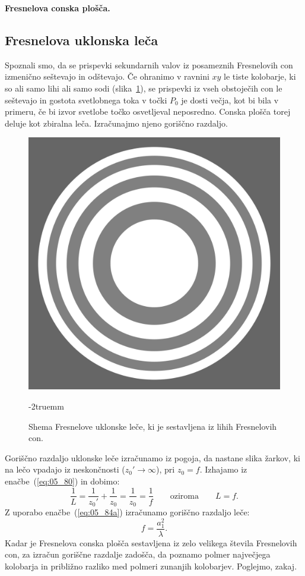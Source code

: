 \begin{example}{\bf Fresnelova conska plošča.}
\subsection*{Fresnelova uklonska leča}
Spoznali smo, da se prispevki sekundarnih valov iz posameznih Fresnelovih con izmenično
seštevajo in odštevajo. Če ohranimo v ravnini $xy$ le tiste kolobarje, ki so ali samo 
lihi ali samo sodi (slika~\ref{fig:05_lecaFr}), se prispevki iz vseh obstoječih con le seštevajo in
gostota svetlobnega toka v točki $P_0$ je dosti večja, kot bi bila 
v primeru, če bi izvor svetlobe točko osvetljeval neposredno. Conska plošča torej 
deluje kot zbiralna leča. Izračunajmo njeno goriščno razdaljo. 
\begin{figure}[ht]
\centering
\includegraphics[width=38truemm]{slike/05_FresLeca.png}
\caption{Shema Fresnelove uklonske leče, ki je sestavljena iz lihih Fresnelovih con. }
\label{fig:05_lecaFr}
\vglue-2truemm
\end{figure}

Goriščno razdaljo uklonske leče izračunamo iz pogoja, da nastane slika 
žarkov, ki na lečo vpadajo iz neskončnosti ($z_0'\to \infty$), pri $z_0 = f$. Izhajamo 
iz enačbe~(\ref{eq:05_80}) in dobimo:
\begin{equation}
\frac{1}{L} = \frac{1}{z_0'}+ \frac{1}{z_0}= \frac{1}{z_0} = \frac{1}{f}\qquad \mathrm{oziroma}\qquad L=f.
\label{eq:05_91}
\end{equation}
Z uporabo enačbe~(\ref{eq:05_84a}) izračunamo goriščno razdaljo leče:
\begin{equation}
f = \frac{a_1^2}{\lambda}.
\label{eq:05_92}
\end{equation}
Kadar je Fresnelova conska plošča sestavljena iz zelo velikega števila Fresnelovih con, za izračun goriščne
razdalje zadošča, da poznamo polmer največjega kolobarja in približno razliko med polmeri zunanjih kolobarjev. Poglejmo, zakaj.


\end{example}

